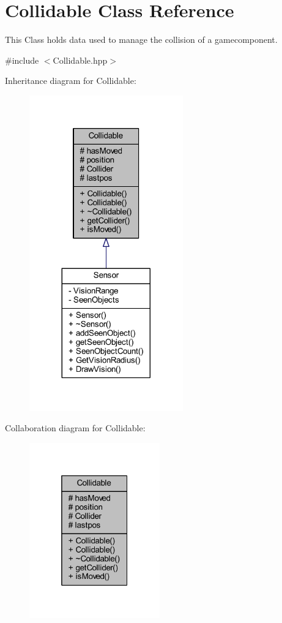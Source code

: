 \hypertarget{class_collidable}{\section{Collidable Class Reference}
\label{class_collidable}
}


This Class holds data used to manage the collision of a gamecomponent.  




{\ttfamily \#include $<$Collidable.\-hpp$>$}



Inheritance diagram for Collidable\-:\nopagebreak
\begin{figure}[H]
\begin{center}
\leavevmode
\includegraphics[width=188pt]{class_collidable__inherit__graph}
\end{center}
\end{figure}


Collaboration diagram for Collidable\-:\nopagebreak
\begin{figure}[H]
\begin{center}
\leavevmode
\includegraphics[width=160pt]{class_collidable__coll__graph}
\end{center}
\end{figure}
